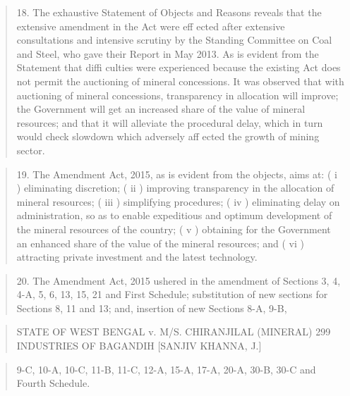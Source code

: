 \documentclass[12pt,a4paper]{article}
\newenvironment{judgequote}
  {\begin{quote}\small}
  {\end{quote}}
\begin{document}
\begin{judgequote}
18. The exhaustive Statement of Objects and Reasons reveals that
the extensive amendment in the Act were eff ected after extensive
consultations and intensive scrutiny by the Standing Committee on
Coal and Steel, who gave their Report in May 2013. As is evident from
the Statement that diffi culties were experienced because the existing
Act does not permit the auctioning of mineral concessions. It was
observed that with auctioning of mineral concessions, transparency in
allocation will improve; the Government will get an increased share of
the value of mineral resources; and that it will alleviate the procedural
delay, which in turn would check slowdown which adversely aff ected
the growth of mining sector.
\end{judgequote}

\begin{judgequote}
19. The Amendment Act, 2015, as is evident from the objects, aims
at: ( i ) eliminating discretion; ( ii ) improving transparency in the
allocation of mineral resources; ( iii ) simplifying procedures; ( iv )
eliminating delay on administration, so as to enable expeditious and
optimum development of the mineral resources of the country; ( v )
obtaining for the Government an enhanced share of the value of the
mineral resources; and ( vi ) attracting private investment and the latest
technology.
\end{judgequote}

\begin{judgequote}
20. The Amendment Act, 2015 ushered in the amendment of Sections 3,
4, 4-A, 5, 6, 13, 15, 21 and First Schedule; substitution of new sections
for Sections 8, 11 and 13; and, insertion of new Sections 8-A, 9-B,
\end{judgequote}



\begin{judgequote}
STATE OF WEST BENGAL v. M/S. CHIRANJILAL (MINERAL) 299
INDUSTRIES OF BAGANDIH [SANJIV KHANNA, J.]
\end{judgequote}

\begin{judgequote}
9-C, 10-A, 10-C, 11-B, 11-C, 12-A, 15-A, 17-A, 20-A, 30-B, 30-C
and Fourth Schedule.
\end{judgequote}
\end{document}
